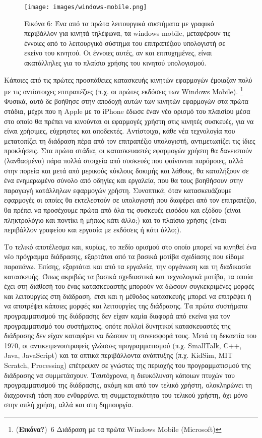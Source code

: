 \documentclass[
]{article}
\begin{document}
\leavevmode{}%
\begin{figure}
\hypertarget{fig:windows-mobile}{%
\centering
\texttt{[image: images/windows-mobile.png]}
\caption{Εικόνα 6: Ένα από τα πρώτα λειτουργικά συστήματα με γραφικό
περιβάλλον για κινητά τηλέφωνα, τα windows mobile, μεταφέρουν τις
έννοιες από το λειτουργικό σύστημα του επιτραπέζιου υπολογιστή σε εκείνο
του κινητού. Οι έννοιες αυτές, αν και επιτυχημένες, είναι ακατάλληλες
για το πλαίσιο χρήσης του κινητού
υπολογισμού.}\label{fig:windows-mobile}
}
\end{figure}

Κάποιες από τις πρώτες προσπάθειες κατασκευής κινητών εφαρμογών έμοιαζαν
πολύ με τις αντίστοιχες επιτραπέζιες (π.χ. οι πρώτες εκδόσεις των
Windows Mobile). \footnote{(\textbf{Εικόνα?})~6 Διάδραση με τα πρώτα
  Windows Mobile (Microsoft)} Φυσικά, αυτό δε βοήθησε στην αποδοχή αυτών
των κινητών εφαρμογών στα πρώτα στάδια, μέχρι που η Apple με το iPhone
έδωσε έναν νέο ορισμό του πλαισίου μέσα στο οποίο θα πρέπει να κινούνται
οι εφαρμογές χρήστη στις κινητές συσκευές, για να είναι χρήσιμες,
εύχρηστες και αποδεκτές. Αντίστοιχα, κάθε νέα τεχνολογία που μετατοπίζει
τη διάδραση πέρα από τον επιτραπέζιο υπολογιστή, αντιμετωπίζει τις ίδιες
προκλήσεις. Στα πρώτα στάδια, οι κατασκευαστές εφαρμογών χρήστη θα
δανειστούν (λανθασμένα) πάρα πολλά στοιχεία από συσκευές που φαίνονται
παρόμοιες, αλλά στην πορεία και μετά από μερικούς κύκλους δοκιμής και
λάθους, θα καταλήξουν σε ένα ενημερωμένο σύνολο από οδηγίες και
εργαλεία, που θα τους βοηθήσουν στην παραγωγή κατάλληλων εφαρμογών
χρήστη. Συνοπτικά, όταν κατασκευάζουμε εφαρμογές οι οποίες θα
εκτελεστούν σε υπολογιστή που διαφέρει από τον επιτραπέζιο, θα πρέπει να
προσέχουμε πρώτα από όλα τις συσκευές εισόδου και εξόδου (είναι
πληκτρολόγιο και ποντίκι ή μήπως κάτι άλλο;) και το πλαίσιο χρήσης
(είναι περιβάλλον γραφείου και εργασία με εκδόσεις ή κάτι άλλο;).

Το τελικό αποτέλεσμα και, κυρίως, το πεδίο ορισμού στο οποίο μπορεί να
κινηθεί ένα νέο πρόγραμμα διάδρασης, εξαρτάται από τα βασικά μοτίβα
σχεδίασης που είδαμε παραπάνω. Επίσης, εξαρτάται και από τα εργαλεία,
την οργάνωση και τη διαδικασία κατασκευής. Όπως ακριβώς τα βασικά
σχεδιαστικά και τεχνολογικά μοτίβα, τα οποία έχει στη διάθεσή του ένας
κατασκευαστής μπορούν να δώσουν συγκεκριμένες μορφές και λειτουργίες στη
διάδραση, έτσι και η μέθοδος κατασκευής μπορεί να επιτρέψει ή να
αποτρέψει κάποιες μορφές και λειτουργίες της διάδρασης. Τα πρώτα
συστήματα προγραμματισμού της διάδρασης δεν είχαν καμία διαφορά από
εκείνα για τον προγραμματισμό του συστήματος, οπότε πολλοί δυνητικοί
κατασκευαστές της διάδρασης δεν είχαν καταφέρει να δώσουν τη συνεισφορά
τους. Μετά τη δεκαετία του 1970, οι αντικειμενοστραφείς γλώσσες
προγραμματισμού (π.χ. SmallTalk, C++, Java, JavaScript) και τα οπτικά
περιβάλλοντα ανάπτυξης (π.χ. KidSim, MIT Scratch, Processing) επέτρεψαν
σε γνώστες της περιοχής του προγραμματισμού της διάδρασης να
συμμετάσχουν. Ταυτόχρονα, η διευκόλυνση κάποιων πτυχών του
προγραμματισμού της διάδρασης, ακόμη και από τον τελικό χρήστη,
ολοκληρώνει τη διαχρονική τάση που ενθαρρύνει τη συμμετοχικότητα του
τελικού χρήστη, όχι μόνο στην απλή χρήση, αλλά και στη δημιουργία.
\end{document}
